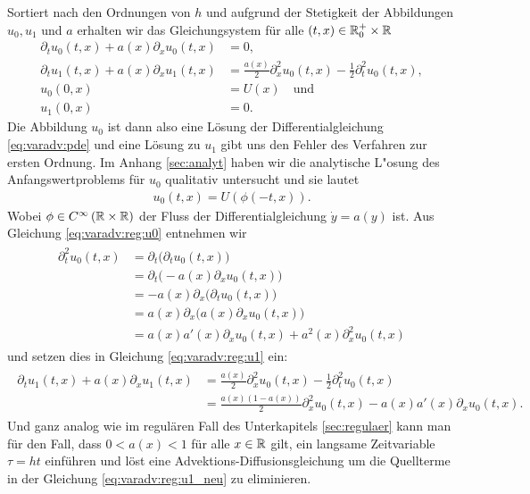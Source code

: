 Sortiert nach den Ordnungen von $h$ und aufgrund der Stetigkeit der Abbildungen
$u_0, u_1$ und $a$ erhalten wir das Gleichungsystem für alle $(t,x) \in \mathbb R^+_0
\times \mathbb R$
\begin{align}
\label{eq:varadv:reg:u0}
\partial_t u_0(t,x) + a(x) \partial_x u_0(t, x) &= 0,\\
\label{eq:varadv:reg:u1}
\partial_t u_1(t,x) + a(x) \partial_x u_1(t, x) &= \frac{a(x)}{2} \partial^2_x u_0(t,x) - \frac{1}{2} \partial^2_t u_0(t,x),\\
u_0(0,x) &= U(x) \quad \text{und}\\
u_1(0,x) &= 0.
\end{align}
Die Abbildung $u_0$ ist dann also eine Lösung der Differentialgleichung
\eqref{eq:varadv:pde} und eine Lösung zu $u_1$ gibt uns den Fehler des Verfahren
zur ersten Ordnung.
Im Anhang \ref{sec:analyt} haben wir die analytische L"osung
des Anfangswertproblems für $u_0$ qualitativ untersucht und sie lautet
\begin{align}
\label{eq:varadv:reg:u0_loesung}
u_0(t,x) = U( \phi(-t, x) ).
\end{align}
Wobei $\phi \in C^\infty \left( \mathbb R \times \mathbb R \right)$ der Fluss der Differentialgleichung $\dot y = a(y)$ ist.
Aus Gleichung \eqref{eq:varadv:reg:u0} entnehmen wir
\begin{align}\label{eq:varadv:kleina:2teabl}
\begin{split}
\partial^2_t u_0(t,x) &= \partial_t \bigl( \partial_t u_0(t,x) \bigr)\\
&= \partial_t \bigl( - a(x) \partial_x u_0(t, x) \bigr)\\
&= - a(x) \partial_x \bigl( \partial_t u_0(t, x) \bigr)\\
&= a(x) \partial_x \bigl( a(x) \partial_x u_0(t, x) \bigr)\\
&= a(x) a'(x) \partial_x u_0(t,x) + a^2(x) \partial^2_x u_0(t,x)
\end{split}
\end{align}
und setzen dies in Gleichung \eqref{eq:varadv:reg:u1} ein:
\begin{align}\label{eq:varadv:reg:u1_neu}
\begin{split}
\partial_t u_1(t,x) + a(x) \partial_x u_1(t, x) &= \frac{a(x)}{2} \partial^2_x u_0(t,x) - \frac{1}{2} \partial^2_t u_0(t,x)\\
&= \frac{a(x)(1 - a(x) )}{2} \partial^2_x u_0(t,x) - a(x) a'(x)  \partial_x u_0(t,x).
\end{split}
\end{align}
Und ganz analog wie im regulären Fall des Unterkapitels \ref{sec:regulaer} kann man für den Fall, dass $0 < a(x) < 1$ für alle $x \in \mathbb R$ gilt, ein langsame Zeitvariable $\tau = ht$ einführen und löst eine Advektions-Diffusionsgleichung um die Quellterme in der Gleichung \eqref{eq:varadv:reg:u1_neu} zu eliminieren.
